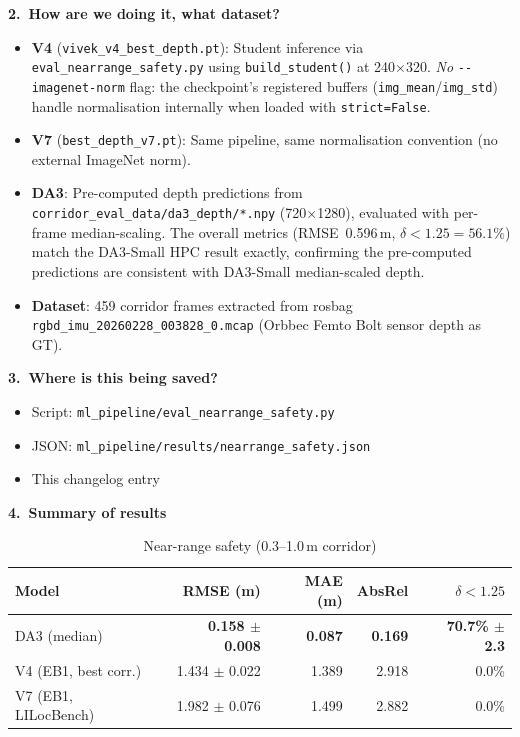 \documentclass[11pt,a4paper]{article}
\begin{document}
\textbf{2.\ How are we doing it, what dataset?}

\begin{itemize}[nosep]
  \item \textbf{V4} (\texttt{vivek\_v4\_best\_depth.pt}): Student
    inference via \texttt{eval\_nearrange\_safety.py} using
    \texttt{build\_student()} at 240$\times$320. \emph{No}
    \texttt{-{}-imagenet-norm} flag: the checkpoint's registered
    buffers (\texttt{img\_mean}/\texttt{img\_std}) handle
    normalisation internally when loaded with \texttt{strict=False}.
  \item \textbf{V7} (\texttt{best\_depth\_v7.pt}): Same pipeline,
    same normalisation convention (no external ImageNet norm).
  \item \textbf{DA3}: Pre-computed depth predictions from
    \texttt{corridor\_eval\_data/da3\_depth/*.npy} (720$\times$1280),
    evaluated with per-frame median-scaling. The overall metrics
    (RMSE~0.596\,m, $\delta < 1.25 = 56.1\%$) match the DA3-Small
    HPC result exactly, confirming the pre-computed predictions are
    consistent with DA3-Small median-scaled depth.
  \item \textbf{Dataset}: 459 corridor frames extracted from rosbag
    \texttt{rgbd\_imu\_20260228\_003828\_0.mcap} (Orbbec Femto Bolt
    sensor depth as GT).
\end{itemize}

\textbf{3.\ Where is this being saved?}

\begin{itemize}[nosep]
  \item Script: \texttt{ml\_pipeline/eval\_nearrange\_safety.py}
  \item JSON: \texttt{ml\_pipeline/results/nearrange\_safety.json}
  \item This changelog entry
\end{itemize}

\textbf{4.\ Summary of results}

\begin{table}[h]
\centering
\caption{Near-range safety (0.3--1.0\,m corridor)}
\label{tab:nearrange-log}
\begin{tabular}{lrrrr}
\toprule
\textbf{Model} & \textbf{RMSE (m)} & \textbf{MAE (m)} & \textbf{AbsRel} & \textbf{$\delta < 1.25$} \\
\midrule
DA3 (median)         & \textbf{0.158 $\pm$ 0.008} & \textbf{0.087} & \textbf{0.169} & \textbf{70.7\% $\pm$ 2.3} \\
V4 (EB1, best corr.) & 1.434 $\pm$ 0.022 & 1.389 & 2.918 & 0.0\% \\
V7 (EB1, LILocBench) & 1.982 $\pm$ 0.076 & 1.499 & 2.882 & 0.0\% \\
\bottomrule
\end{tabular}
\end{table}
\end{document}
